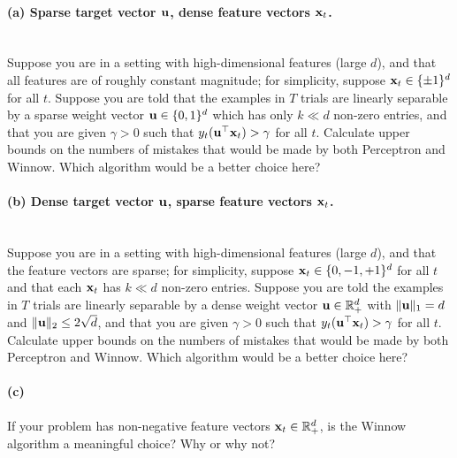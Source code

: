 \paragraph{(a) Sparse target vector ${\mathbf u}$, dense feature vectors ${\mathbf x}_t$. }
~\\
Suppose you are in a setting with high-dimensional features (large $d$), and 
that all features are of roughly constant magnitude; for simplicity, suppose ${\mathbf x}_t\in\{\pm1\}^d$ for all $t$.
Suppose you are told that the examples in $T$ trials are linearly separable by a sparse weight vector ${\mathbf u}\in\{0,1\}^d$ which has only $k\ll d$ non-zero entries, and that you are given $\gamma>0$ such that $y_t({\mathbf u}^\top{\mathbf x}_t) > \gamma$ for all $t$.
Calculate upper bounds on the numbers of mistakes that would be made by both Perceptron and Winnow. Which algorithm would be a better choice here?
%

\paragraph{(b) Dense target vector ${\mathbf u}$, sparse feature vectors ${\mathbf x}_t$.}
~\\
Suppose you are in a setting with high-dimensional features (large $d$), and 
that the feature vectors are sparse; for simplicity, suppose ${\mathbf x}_t\in\{0,-1,+1\}^d$ for all $t$ and that each ${\mathbf x}_t$ has $k\ll d$ non-zero entries.
Suppose you are told the examples in $T$ trials are linearly separable by a dense weight vector ${\mathbf u}\in{\mathbb R}_+^d$ with $\|{\mathbf u}\|_1= d$ and $\|{\mathbf u}\|_2\leq 2\sqrt{d}$, and that you are given $\gamma>0$ such that $y_t({\mathbf u}^\top{\mathbf x}_t) > \gamma$ for all $t$.
Calculate upper bounds on the numbers of mistakes that would be made by both Perceptron and Winnow. Which algorithm would be a better choice here?
%
~\\
\paragraph{(c)} If your problem has non-negative feature vectors ${\mathbf x}_t\in{\mathbb R}_+^d$, is the Winnow algorithm a meaningful choice? Why or why not? 



